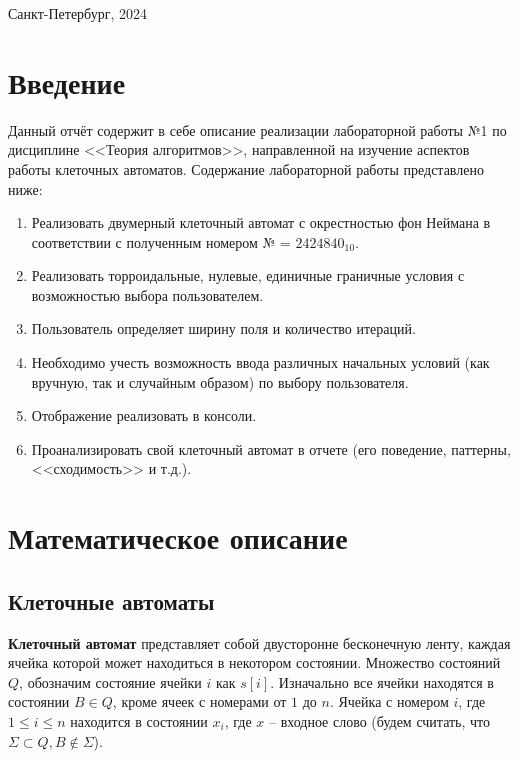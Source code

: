 \documentclass[a4paper, final]{article}
\begin{document}
\hfill \break
\hfill \break
\begin{center} \small{Санкт-Петербург, 2024} \end{center}
\thispagestyle{empty} %

\newpage

\tableofcontents

\newpage

\cleardoublepage
{}
{}
\section*{Введение}
Данный отчёт содержит в себе описание реализации лабораторной работы №1 по дисциплине <<Теория
алгоритмов>>, направленной на изучение аспектов работы клеточных автоматов. Содержание лабораторной
работы представлено ниже:
\begin{enumerate}
  \item Реализовать двумерный клеточный автомат с окрестностью фон Неймана в соответствии с 
  полученным номером № = $2424840_{10}$.
  \item Реализовать торроидальные, нулевые, единичные граничные условия с возможностью выбора пользователем.
  \item Пользователь определяет ширину поля и количество итераций. 
  \item Необходимо учесть возможность ввода различных начальных условий (как вручную, так и 
  случайным образом) по выбору пользователя. 
  \item Отображение реализовать в консоли.
  \item Проанализировать свой клеточный автомат в отчете (его поведение, паттерны, <<сходимость>> 
  и т.д.). 
\end{enumerate}

\newpage
\section{Математическое описание}
\subsection{Клеточные автоматы}
\textbf{Клеточный автомат} представляет собой двусторонне бесконечную ленту, каждая ячейка 
которой может находиться в некотором состоянии. Множество состояний $Q$, обозначим состояние ячейки $i$ 
как $s[i]$. Изначально все ячейки находятся в состоянии $B \in Q$, кроме ячеек с номерами от $1$ до $n$. 
Ячейка с номером $i$, где $1 \leq i \leq n$ находится в состоянии $x_i$, где $x$ -- входное слово
(будем считать, что $\Sigma \subset Q, B \not \in \Sigma$).
\end{document}
